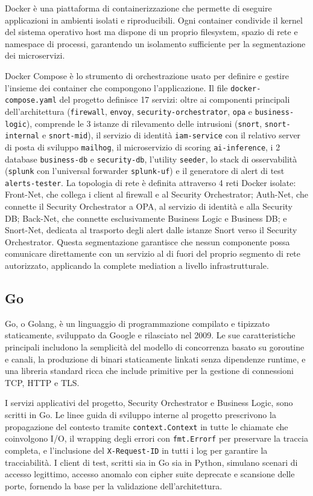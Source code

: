 Docker è una piattaforma di containerizzazione che permette di eseguire applicazioni in ambienti isolati e riproducibili. Ogni container condivide il kernel del sistema operativo host ma dispone di un proprio filesystem, spazio di rete e namespace di processi, garantendo un isolamento sufficiente per la segmentazione dei microservizi.

  Docker Compose è lo strumento di orchestrazione usato per definire e gestire l'insieme dei
  container che compongono l'applicazione. Il file \texttt{docker-compose.yaml} del progetto
  definisce 17 servizi: oltre ai componenti principali dell'architettura
  (\texttt{firewall}, \texttt{envoy}, \texttt{security-orchestrator}, \texttt{opa} e
  \texttt{business-logic}), comprende le 3 istanze di rilevamento delle intrusioni
  (\texttt{snort}, \texttt{snort-internal} e \texttt{snort-mid}), il servizio di identità
  \texttt{iam-service} con il relativo server di posta di sviluppo \texttt{mailhog}, il
  microservizio di scoring \texttt{ai-inference}, i 2 database \texttt{business-db} e
  \texttt{security-db}, l'utility \texttt{seeder}, lo stack di osservabilità (\texttt{splunk}
  con l'universal forwarder \texttt{splunk-uf}) e il generatore di alert di test
  \texttt{alerts-tester}. La topologia di rete è definita attraverso 4 reti Docker
  isolate: Front-Net, che collega i client al firewall e al Security Orchestrator; Auth-Net, che
  connette il Security Orchestrator a OPA, al servizio di identità e alla Security DB;
  Back-Net, che connette esclusivamente Business Logic e Business DB; e Snort-Net, dedicata al
  trasporto degli alert dalle istanze Snort verso il Security Orchestrator. Questa segmentazione
  garantisce che nessun componente possa comunicare direttamente con un servizio al di fuori
  del proprio segmento di rete autorizzato, applicando la complete mediation a livello
  infrastrutturale.

\subsection{Go}

Go, o Golang, è un linguaggio di programmazione compilato e tipizzato staticamente, sviluppato da Google e rilasciato nel 2009. Le sue caratteristiche principali includono la semplicità del modello di concorrenza basato su goroutine e canali, la produzione di binari staticamente linkati senza dipendenze runtime, e una libreria standard ricca che include primitive per la gestione di connessioni TCP, HTTP e TLS.

I servizi applicativi del progetto, Security Orchestrator e Business Logic, sono scritti in Go. Le linee guida di sviluppo interne al progetto prescrivono la propagazione del contesto tramite \texttt{context.Context} in tutte le chiamate che coinvolgono I/O, il wrapping degli errori con \texttt{fmt.Errorf} per preservare la traccia completa, e l'inclusione del \texttt{X-Request-ID} in tutti i log per garantire la tracciabilità. I client di test, scritti sia in Go sia in Python, simulano scenari di accesso legittimo, accesso anomalo con cipher suite deprecate e scansione delle porte, fornendo la base per la validazione dell'architettura.
